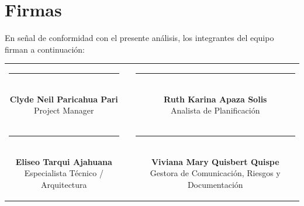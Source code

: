 \documentclass[11pt,a4paper]{article}
\begin{document}
\section{Firmas}
\noindent En señal de conformidad con el presente análisis, los integrantes del equipo firman a continuación:

\vspace{1.5cm}
\begin{center}
\begin{tabular}{c c c}
    \parbox{6.5cm}{\centering \rule{6.0cm}{0.6pt}\\[5pt] \textbf{Clyde Neil Paricahua Pari}\\[2pt] {\footnotesize Project Manager}}
    & \hspace{0.8cm} &
    \parbox{6.5cm}{\centering \rule{6.0cm}{0.6pt}\\[5pt] \textbf{Ruth Karina Apaza Solis}\\[2pt] {\footnotesize Analista de Planificación}}
    \\[2.0cm]
    \parbox{6.5cm}{\centering \rule{6.0cm}{0.6pt}\\[5pt] \textbf{Eliseo Tarqui Ajahuana}\\[2pt] {\footnotesize Especialista Técnico / Arquitectura}}
    & \hspace{0.8cm} &
    \parbox{6.5cm}{\centering \rule{6.0cm}{0.6pt}\\[5pt] \textbf{Viviana Mary Quisbert Quispe}\\[2pt] {\footnotesize Gestora de Comunicación, Riesgos y Documentación}}
\end{tabular}
\end{center}
\end{document}
